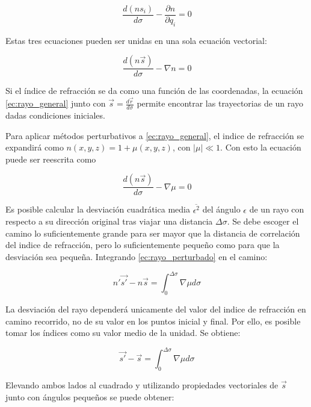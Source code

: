 \begin{equation}
    \frac{d(ns_i)}{d\sigma} - \frac{\partial n}{\partial q_i} = 0
\end{equation}

Estas tres ecuaciones pueden ser unidas en una sola ecuación vectorial: 

\begin{equation}\label{ec:rayo_general}
    \frac{d(n\vec s)}{d \sigma} - \nabla n = 0
\end{equation}

Si el índice de refracción se da como una función de las coordenadas, la ecuación \ref{ec:rayo_general} junto con $\vec s = \frac{d \vec r}{d \sigma}$ permite encontrar las trayectorias de un rayo dadas condiciones iniciales. 

Para aplicar métodos perturbativos a \ref{ec:rayo_general}, el indice de refracción se expandirá como $n(x, y, z) = 1+ \mu(x, y, z)$, con $|\mu| \ll 1$. Con esto la ecuación puede ser reescrita como 

\begin{equation}\label{ec:rayo_perturbado}
    \frac{d(n\vec s)}{d \sigma} - \nabla \mu = 0
\end{equation}

Es posible calcular la desviación cuadrática media $\overline{\epsilon^2}$ del ángulo $\epsilon$ de un rayo con respecto a su dirección original tras viajar una distancia $\Delta \sigma$. Se debe escoger el camino lo suficientemente grande para ser mayor que la distancia de correlación del indice de refracción, pero lo suficientemente pequeño como para que la desviación sea pequeña. Integrando \ref{ec:rayo_perturbado} en el camino:

\begin{equation}
    n'\vec{s'} - n\vec{s} = \int_{0}^{\Delta \sigma} \nabla \mu d\sigma
\end{equation}

La desviación del rayo dependerá unicamente del valor del indice de refracción en camino recorrido, no de su valor en los puntos inicial y final. Por ello, es posible tomar los índices como su valor medio de la unidad. Se obtiene:

\begin{equation}
    \vec{s'} - \vec{s} = \int_{0}^{\Delta \sigma} \nabla \mu d\sigma
\end{equation}

Elevando ambos lados al cuadrado y utilizando propiedades vectoriales de $\vec{s}$ junto con ángulos pequeños se puede obtener:

